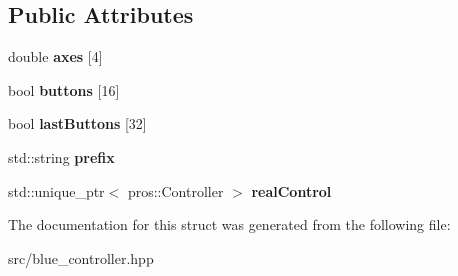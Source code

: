 \subsection*{Public Attributes}
\begin{DoxyCompactItemize}
\item 
\mbox{\label{structbros_1_1Controller_a8e664b6bdb9a9f20ef9440373e46f429}} 
double {\bfseries axes} \mbox{[}4\mbox{]}
\item 
\mbox{\label{structbros_1_1Controller_a0b12226bd94a5a1474ec841da47e9db3}} 
bool {\bfseries buttons} \mbox{[}16\mbox{]}
\item 
\mbox{\label{structbros_1_1Controller_a41e4769a0ac7e3b83b96e167e1fc3fab}} 
bool {\bfseries last\+Buttons} \mbox{[}32\mbox{]}
\item 
\mbox{\label{structbros_1_1Controller_a40ae669996199bb02fa1d898d8486be2}} 
std\+::string {\bfseries prefix}
\item 
\mbox{\label{structbros_1_1Controller_aea5f3a9e7c0e21163f188b90c3500d19}} 
std\+::unique\+\_\+ptr$<$ pros\+::\+Controller $>$ {\bfseries real\+Control}
\end{DoxyCompactItemize}


The documentation for this struct was generated from the following file\+:\begin{DoxyCompactItemize}
\item 
src/blue\+\_\+controller.\+hpp\end{DoxyCompactItemize}
